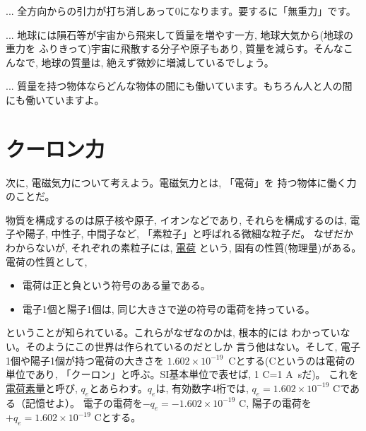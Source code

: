 \begin{faq}{\small{}
... 全方向からの引力が打ち消しあって0になります。要するに「無重力」です。}\end{faq}

\begin{faq}{\small{}
... 地球には隕石等が宇宙から飛来して質量を増やす一方, 地球大気から(地球の重力を
ふりきって)宇宙に飛散する分子や原子もあり, 質量を減らす。そんなこんなで, 地球の質量は, 
絶えず微妙に増減しているでしょう。}\end{faq}

\begin{faq}{\small{}
... 質量を持つ物体ならどんな物体の間にも働いています。もちろん人と人の間にも働いていますよ。}\end{faq}
\hv



\section{クーロン力}\label{sect:CoulombForce}
次に, 電磁気力について考えよう。電磁気力とは, 「電荷」を
持つ物体に働く力のことだ。

物質を構成するのは原子核や原子, イオンなどであり, それらを構成するのは, 
電子や陽子, 中性子, 中間子など, 「素粒子」と呼ばれる微細な粒子だ。
なぜだかわからないが, それぞれの素粒子には, \underline{電荷}
という, 固有の性質(物理量)がある。
電荷の性質として, 
\begin{itemize}
\item 電荷は正と負という符号のある量である。
\item 電子1個と陽子1個は, 同じ大きさで逆の符号の電荷を持っている。
\end{itemize}
ということが知られている。これらがなぜなのかは, 根本的には
わかっていない。そのようにこの世界は作られているのだとしか
言う他はない。そして, 電子1個や陽子1個が持つ電荷の大きさを
$1.602\times 10^{-19}$~Cとする(Cというのは電荷の単位であり, 
「クーロン」と呼ぶ。SI基本単位で表せば, 1 C=1 A~sだ)。
これを\underline{電荷素量}と呼び, 
$q_e$とあらわす。$q_e$は, 有効数字4桁では, 
$q_e=1.602\times10^{-19}\text{ C}$である（記憶せよ）。
電子の電荷を$-q_e=-1.602\times10^{-19}\text{ C}$, 
陽子の電荷を$+q_e=1.602\times10^{-19}\text{ C}$とする。

